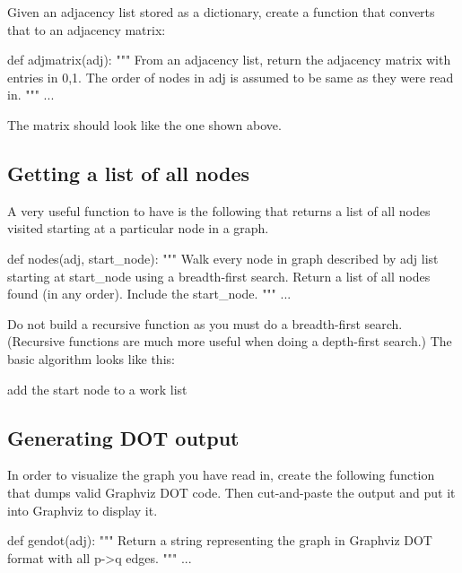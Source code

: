 \begin{fullwidth}
Given an adjacency list stored as a dictionary, create a function that converts that to an adjacency matrix:
 
\begin{pyverbatim}
def adjmatrix(adj):
    """
    From an adjacency list, return the adjacency matrix with entries in {0,1}.
    The order of nodes in adj is assumed to be same as they were read in.
    """
    ...
\end{pyverbatim}

\noindent The matrix should look like the one shown above.

\subsection{Getting a list of all nodes}

A very useful function to have is the following that returns a list of all nodes visited starting at a particular node in a graph. 
 
\begin{pyverbatim}
def nodes(adj, start_node):
    """
    Walk every node in graph described by adj list starting at start_node
    using a breadth-first search.  Return a list of all nodes found (in
    any order). Include the start_node.
    """
    ...
\end{pyverbatim}

\noindent Do not build a recursive function as you must do a breadth-first search. (Recursive functions are much more useful when doing a depth-first search.) The basic algorithm looks like this:

\begin{algorithm}[H]
\SetInd{.3em}{.3em}
add the start node to a work list\;
\;
\end{algorithm}

\subsection{Generating DOT output}

In order to visualize the graph you have read in, create the following function that dumps valid Graphviz DOT code. Then cut-and-paste the output and put it into Graphviz to display it.
 
\begin{pyverbatim}
def gendot(adj):
    """
    Return a string representing the graph in Graphviz DOT format
    with all p->q edges.
    """
    ...
\end{pyverbatim}


\end{fullwidth}
